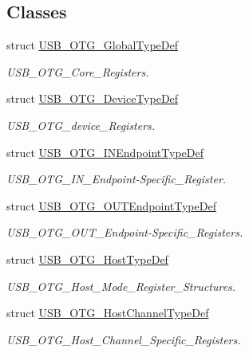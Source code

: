 \subsection*{Classes}
\begin{DoxyCompactItemize}
\item 
struct \mbox{\hyperlink{struct_u_s_b___o_t_g___global_type_def}{U\+S\+B\+\_\+\+O\+T\+G\+\_\+\+Global\+Type\+Def}}
\begin{DoxyCompactList}\small\item\em U\+S\+B\+\_\+\+O\+T\+G\+\_\+\+Core\+\_\+\+Registers. \end{DoxyCompactList}\item 
struct \mbox{\hyperlink{struct_u_s_b___o_t_g___device_type_def}{U\+S\+B\+\_\+\+O\+T\+G\+\_\+\+Device\+Type\+Def}}
\begin{DoxyCompactList}\small\item\em U\+S\+B\+\_\+\+O\+T\+G\+\_\+device\+\_\+\+Registers. \end{DoxyCompactList}\item 
struct \mbox{\hyperlink{struct_u_s_b___o_t_g___i_n_endpoint_type_def}{U\+S\+B\+\_\+\+O\+T\+G\+\_\+\+I\+N\+Endpoint\+Type\+Def}}
\begin{DoxyCompactList}\small\item\em U\+S\+B\+\_\+\+O\+T\+G\+\_\+\+I\+N\+\_\+\+Endpoint-\/\+Specific\+\_\+\+Register. \end{DoxyCompactList}\item 
struct \mbox{\hyperlink{struct_u_s_b___o_t_g___o_u_t_endpoint_type_def}{U\+S\+B\+\_\+\+O\+T\+G\+\_\+\+O\+U\+T\+Endpoint\+Type\+Def}}
\begin{DoxyCompactList}\small\item\em U\+S\+B\+\_\+\+O\+T\+G\+\_\+\+O\+U\+T\+\_\+\+Endpoint-\/\+Specific\+\_\+\+Registers. \end{DoxyCompactList}\item 
struct \mbox{\hyperlink{struct_u_s_b___o_t_g___host_type_def}{U\+S\+B\+\_\+\+O\+T\+G\+\_\+\+Host\+Type\+Def}}
\begin{DoxyCompactList}\small\item\em U\+S\+B\+\_\+\+O\+T\+G\+\_\+\+Host\+\_\+\+Mode\+\_\+\+Register\+\_\+\+Structures. \end{DoxyCompactList}\item 
struct \mbox{\hyperlink{struct_u_s_b___o_t_g___host_channel_type_def}{U\+S\+B\+\_\+\+O\+T\+G\+\_\+\+Host\+Channel\+Type\+Def}}
\begin{DoxyCompactList}\small\item\em U\+S\+B\+\_\+\+O\+T\+G\+\_\+\+Host\+\_\+\+Channel\+\_\+\+Specific\+\_\+\+Registers. \end{DoxyCompactList}\end{DoxyCompactItemize}
